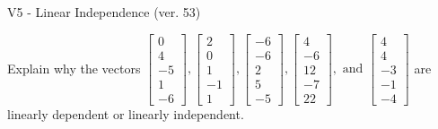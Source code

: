 \begin{exercise}
  \begin{exerciseTitle}V5 - Linear Independence (ver. 53)\end{exerciseTitle}
  \begin{exerciseStatement}
    Explain why the vectors \(\left[\begin{array}{r}
0 \\
4 \\
-5 \\
1 \\
-6
\end{array}\right] , \left[\begin{array}{r}
2 \\
0 \\
1 \\
-1 \\
1
\end{array}\right] , \left[\begin{array}{r}
-6 \\
-6 \\
2 \\
5 \\
-5
\end{array}\right] , \left[\begin{array}{r}
4 \\
-6 \\
12 \\
-7 \\
22
\end{array}\right] , \text{ and } \left[\begin{array}{r}
4 \\
4 \\
-3 \\
-1 \\
-4
\end{array}\right]\) are linearly dependent or linearly independent.	



\end{exerciseStatement}
\end{exercise}
